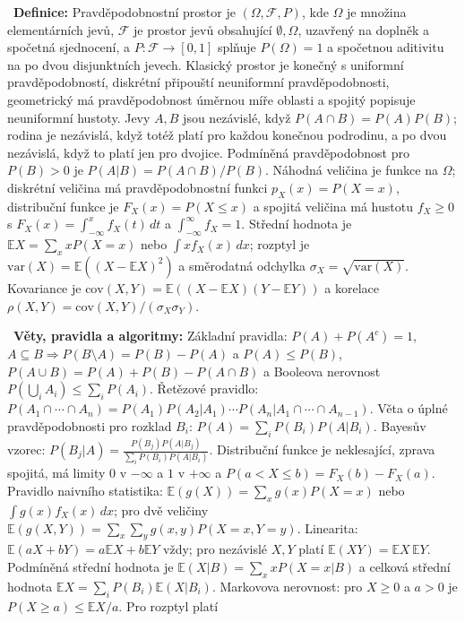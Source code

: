 \begin{odpoved}
\setlength{\parskip}{2pt}
\noindent{}\ \textbf{Definice:} Pravděpodobnostní prostor je
$(\Omega,\mathcal F,P)$, kde $\Omega$ je množina elementárních jevů, $\mathcal F$ je
prostor jevů obsahující $\emptyset,\Omega$, uzavřený na doplněk a spočetná sjednocení,
a $P:\mathcal F\to[0,1]$ splňuje $P(\Omega)=1$ a spočetnou aditivitu na po dvou disjunktních
jevech. Klasický prostor je konečný s uniformní pravděpodobností, diskrétní připouští
neuniformní pravděpodobnosti, geometrický má pravděpodobnost úměrnou míře oblasti a
spojitý popisuje neuniformní hustoty. Jevy $A,B$ jsou nezávislé, když
$P(A\cap B)=P(A)P(B)$; rodina je nezávislá, když totéž platí pro každou konečnou podrodinu,
a po dvou nezávislá, když to platí jen pro dvojice. Podmíněná pravděpodobnost pro
$P(B)>0$ je $P(A|B)=P(A\cap B)/P(B)$. Náhodná veličina je funkce na $\Omega$; diskrétní
veličina má pravděpodobnostní funkci $p_X(x)=P(X=x)$, distribuční funkce je
$F_X(x)=P(X\le x)$ a spojitá veličina má hustotu $f_X\ge0$ s
$F_X(x)=\int_{-\infty}^x f_X(t)\,dt$ a $\int_{-\infty}^{\infty}f_X=1$. Střední hodnota je
$\mathbb E X=\sum_x xP(X=x)$ nebo $\int x f_X(x)\,dx$; rozptyl je
$\mathrm{var}(X)=\mathbb E((X-\mathbb EX)^2)$ a směrodatná odchylka
$\sigma_X=\sqrt{\mathrm{var}(X)}$. Kovariance je
$\mathrm{cov}(X,Y)=\mathbb E((X-\mathbb EX)(Y-\mathbb EY))$ a korelace
$\rho(X,Y)=\mathrm{cov}(X,Y)/(\sigma_X\sigma_Y)$.\par
\noindent{}\ \textbf{Věty, pravidla a algoritmy:} Základní pravidla:
$P(A)+P(A^c)=1$, $A\subseteq B\Rightarrow P(B\setminus A)=P(B)-P(A)$ a $P(A)\le P(B)$,
$P(A\cup B)=P(A)+P(B)-P(A\cap B)$ a Booleova nerovnost
$P(\bigcup_i A_i)\le\sum_iP(A_i)$. Řetězové pravidlo:
$P(A_1\cap\cdots\cap A_n)=P(A_1)P(A_2|A_1)\cdots P(A_n|A_1\cap\cdots\cap A_{n-1})$.
Věta o úplné pravděpodobnosti pro rozklad $B_i$: $P(A)=\sum_iP(B_i)P(A|B_i)$.
Bayesův vzorec:
$P(B_j|A)=\frac{P(B_j)P(A|B_j)}{\sum_iP(B_i)P(A|B_i)}$. Distribuční funkce je
neklesající, zprava spojitá, má limity $0$ v $-\infty$ a $1$ v $+\infty$ a
$P(a<X\le b)=F_X(b)-F_X(a)$. Pravidlo naivního statistika:
$\mathbb E(g(X))=\sum_xg(x)P(X=x)$ nebo $\int g(x)f_X(x)\,dx$; pro dvě veličiny
$\mathbb E(g(X,Y))=\sum_x\sum_y g(x,y)P(X=x,Y=y)$. Linearita:
$\mathbb E(aX+bY)=a\mathbb EX+b\mathbb EY$ vždy; pro nezávislé $X,Y$ platí
$\mathbb E(XY)=\mathbb EX\,\mathbb EY$. Podmíněná střední hodnota je
$\mathbb E(X|B)=\sum_xxP(X=x|B)$ a celková střední hodnota
$\mathbb EX=\sum_iP(B_i)\mathbb E(X|B_i)$. Markovova nerovnost:
pro $X\ge0$ a $a>0$ je $P(X\ge a)\le\mathbb EX/a$. Pro rozptyl platí

\end{odpoved}
